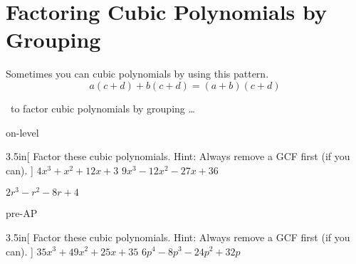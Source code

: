 
\section{Factoring Cubic Polynomials by Grouping}


\begin{myCenteredBox}[width=4.75in,]
    Sometimes you can  cubic polynomials by  
    using this pattern.
    {\Large
    \begin{equation*}
        a(c+d) + b(c+d) = (a+b)(c+d)
    \end{equation*}
    }
\end{myCenteredBox}

\begin{myConceptSteps}{~to factor cubic polynomials by grouping \dots}
\end{myConceptSteps}


\begin{taggedblock}{on-level}
    \begin{my2Problems}[\large]{3.5in}[
        Factor these cubic polynomials. Hint: Always remove a GCF first (if you can).
        ]
        {
            $ 4x^3 + x^2 + 12x + 3 $
        }
        {
            $ 9x^3 - 12x^2 - 27x + 36 $
        }
    \end{my2Problems}
    \begin{myProblem}[\large]{3.5in}
        {
            $ 2r^3 - r^2 - 8r + 4 $
        }
    \end{myProblem}
\end{taggedblock}

\begin{taggedblock}{pre-AP}
    \begin{my2Problems}[\large]{3.5in}[
        Factor these cubic polynomials. Hint: Always remove a GCF first (if you can).
        ]
        {
            $ 35x^3 + 49x^2 + 25x + 35 $
        }
        {
            $ 6p^4 -8p^3 -24p^2 +32p $
        }
    \end{my2Problems}
\end{taggedblock}
